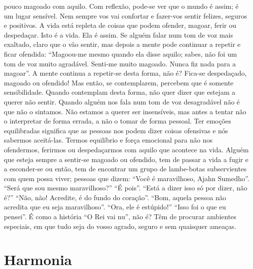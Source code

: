 pouco magoado com aquilo.
Com reflexão, pode-se ver que o mundo é assim; é um
lugar sensível. Nem sempre vos vai confortar e fazer-vos sentir
felizes, seguros e positivos. A vida está repleta de coisas que
podem ofender, magoar, ferir ou despedaçar. Isto é a vida. Ela
é assim. Se alguém falar num tom de voz mais exaltado, claro
que o vão sentir, mas depois a mente pode continuar a repetir
e ficar ofendida: “Magoou-me mesmo quando ela disse aquilo;
sabes, não foi um tom de voz muito agradável. Senti-me
muito magoado. Nunca fiz nada para a magoar”. A mente
continua a repetir-se desta forma, não é? Fica-se despedaçado,
magoado ou ofendido! Mas então, se contemplarem, percebem
que é somente sensibilidade.
Quando contemplam desta forma, não quer dizer que
estejam a querer não sentir. Quando alguém nos fala num tom
de voz desagradável não é que não o sintamos. Não estamos
a querer ser insensíveis, mas antes a tentar não o interpretar
de forma errada, a não o tomar de forma pessoal. Ter emoções
equilibradas significa que as pessoas nos podem dizer coisas
ofensivas e nós sabermos aceitá-las. Termos equilíbrio e força
emocional para não nos ofendermos, ferirmos ou despedaçarmos com aquilo que acontece na vida.
Alguém que esteja sempre a sentir-se magoado ou ofendido, tem de passar a vida a fugir e a esconder-se ou então,
tem de encontrar um grupo de lambe-botas subservientes com
quem possa viver; pessoas que dizem: “Você é maravilhoso,
Ajahn Sumedho”. “Será que sou mesmo maravilhoso?” “É
pois”. “Está a dizer isso só por dizer, não é?” “Não, não!
Acredite, é do fundo do coração”. “Bom, aquela pessoa não
acredita que eu seja maravilhoso”. “Ora, ele é estúpido!”
“Isso foi o que eu pensei”.
É como a história “O Rei vai nu”, não é? Têm de procurar
ambientes especiais, em que tudo seja do vosso agrado,
seguro e sem quaisquer ameaças.

\section{Harmonia}


